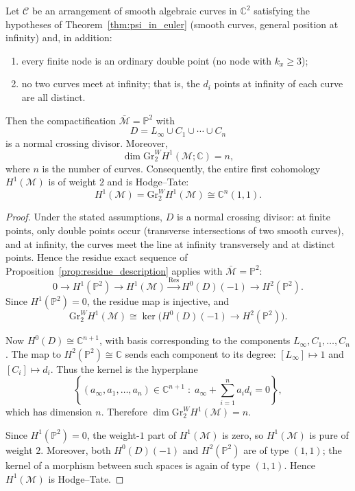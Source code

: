 \documentclass[article,11pt]{amsart} \numberwithin{equation}{section}
\numberwithin{equation}{section}
\begin{document}
{\begin{inp}
	\label{prop:exact_gr2_h1}
	Let $\mathcal C$ be an arrangement of smooth algebraic curves in $\mathbb C^2$ satisfying the hypotheses of Theorem~\ref{thm:psi_in_euler} (smooth curves, general position at infinity) and, in addition:
	\begin{enumerate}
		\item every finite node is an ordinary double point (no node with $k_x\ge 3$);
		\item no two curves meet at infinity; that is, the $d_i$ points at infinity of each curve are all distinct.
	\end{enumerate}
	Then the compactification $\bar{\mathcal M}=\mathbb P^2$ with
	\[
	D = L_\infty \cup C_1 \cup \cdots \cup C_n
	\]
	is a normal crossing divisor. Moreover,
	\[
	\dim \mathrm{Gr}^W_2 H^1(\mathcal M;\mathbb C) = n,
	\]
	where $n$ is the number of curves. Consequently, the entire first cohomology $H^1(\mathcal M)$ is of weight $2$ and is Hodge--Tate:
	\[
	H^1(\mathcal M) = \mathrm{Gr}^W_2 H^1(\mathcal M) \cong \mathbb C^n(1,1).
	\]
\end{inp}

\begin{proof}
	Under the stated assumptions, $D$ is a normal crossing divisor: at finite points, only double points occur (transverse intersections of two smooth curves), and at infinity, the curves meet the line at infinity transversely and at distinct points. Hence the residue exact sequence of Proposition~\ref{prop:residue_description} applies with $\bar{\mathcal M}=\mathbb P^2$:
	\[
	0 \longrightarrow H^1(\mathbb P^2) \longrightarrow H^1(\mathcal M)
	\xrightarrow{\mathrm{Res}} H^0(D)(-1)
	\longrightarrow H^2(\mathbb P^2).
	\]
	Since $H^1(\mathbb P^2)=0$, the residue map is injective, and
	\[
	\mathrm{Gr}^W_2 H^1(\mathcal M) \cong \ker\bigl( H^0(D)(-1) \longrightarrow H^2(\mathbb P^2) \bigr).
	\]
	
	Now $H^0(D)\cong \mathbb C^{n+1}$, with basis corresponding to the components $L_\infty, C_1,\dots,C_n$. The map to $H^2(\mathbb P^2)\cong \mathbb C$ sends each component to its degree: $[L_\infty]\longmapsto 1$ and $[C_i]\longmapsto d_i$. Thus the kernel is the hyperplane
	\[
	\left\{(a_\infty,a_1,\dots,a_n)\in\mathbb C^{n+1} \;:\; a_\infty+\sum_{i=1}^n a_i d_i=0\right\},
	\]
	which has dimension $n$. Therefore $\dim \mathrm{Gr}^W_2 H^1(\mathcal M)=n$.
	
	Since $H^1(\mathbb P^2)=0$, the weight-$1$ part of $H^1(\mathcal M)$ is zero, so $H^1(\mathcal M)$ is pure of weight $2$. Moreover, both $H^0(D)(-1)$ and $H^2(\mathbb P^2)$ are of type $(1,1)$; the kernel of a morphism between such spaces is again of type $(1,1)$. Hence $H^1(\mathcal M)$ is Hodge--Tate.
\end{proof}

}
\end{document}
